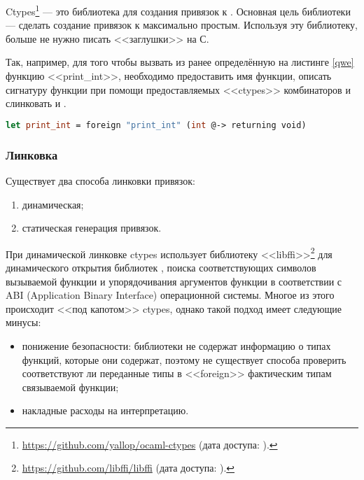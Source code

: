 Ctypes\footnote{\url{https://github.com/yallop/ocaml-ctypes} (дата доступа:   ).} --- это \OCaml{} библиотека для создания привязок к \C{}. Основная цель библиотеки --- сделать создание привязок к \C{} максимально простым. Используя эту библиотеку, больше не нужно писать <<заглушки>> на С{}.

Так, например, для того чтобы вызвать из \OCaml{} ранее определённую на листинге \ref{qwe} функцию <<print\_int>>, необходимо предоставить имя функции, описать сигнатуру функции при помощи предоставляемых <<ctypes>> комбинаторов и слинковать \C{} и \OCaml{}.

\begin{lstlisting}[caption={Привязка к функции <<print\_int>>, определённой на листинге \ref{qwe}, при помощи <<ctypes>>}, language=Caml, frame=single, label ={ctypes_example}]
let print_int = foreign "print_int" (int @-> returning void)
\end{lstlisting}

\subsubsection{Линковка}

Существует два способа линковки привязок:

\begin{enumerate}
	\item динамическая;
	\item статическая генерация привязок.
\end{enumerate}

При динамической линковке ctypes использует библиотеку <<libffi>>\footnote{\url{https://github.com/libffi/libffi} (дата доступа:   ).} для динамического открытия библиотек \C{}, поиска соответствующих символов вызываемой функции и упорядочивания аргументов функции в соответствии с ABI (Application Binary Interface) операционной системы. Многое из этого происходит <<под капотом>> ctypes, однако такой подход имеет следующие минусы:

\begin{itemize}
	\item понижение безопасности: библиотеки \C{} не содержат информацию о типах функций, которые они содержат, поэтому не существует способа проверить соответствуют ли переданные типы в <<foreign>> фактическим типам связываемой функции;
	\item накладные расходы на интерпретацию.
\end{itemize}


